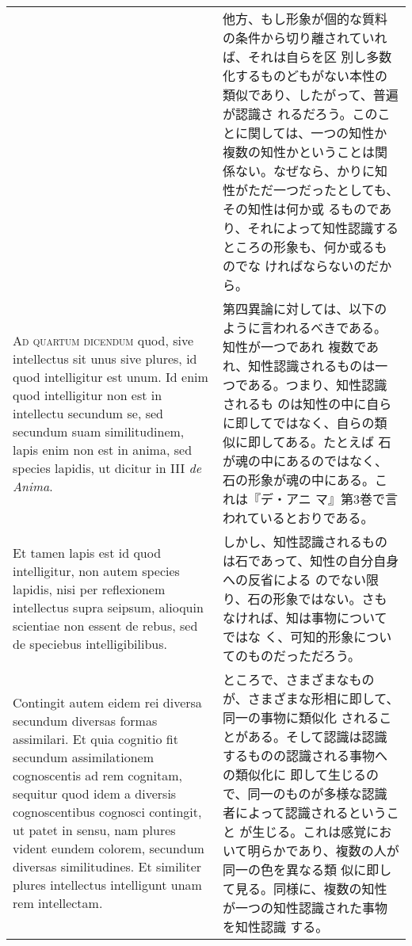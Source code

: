 \documentclass[paper=a4paper,fontsize=10pt,jafontsize=9pt,titlepage]{jlreq}
\begin{document}
\begin{longtable}{p{21em}p{21em}}
&

他方、もし形象が個的な質料の条件から切り離されていれば、それは自らを区
別し多数化するものどもがない本性の類似であり、したがって、普遍が認識さ
れるだろう。このことに関しては、一つの知性か複数の知性かということは関
係ない。なぜなら、かりに知性がただ一つだったとしても、その知性は何か或
るものであり、それによって知性認識するところの形象も、何か或るものでな
ければならないのだから。
 
\\



 {\scshape Ad quartum dicendum} quod, sive intellectus sit unus sive
 plures, id quod intelligitur est unum. Id enim quod intelligitur non
 est in intellectu secundum se, sed secundum suam similitudinem, lapis
 enim non est in anima, sed species lapidis, ut dicitur in III
 {\itshape de Anima}.

&

 第四異論に対しては、以下のように言われるべきである。知性が一つであれ
 複数であれ、知性認識されるものは一つである。つまり、知性認識されるも
 のは知性の中に自らに即してではなく、自らの類似に即してある。たとえば
 石が魂の中にあるのではなく、石の形象が魂の中にある。これは『デ・アニ
 マ』第3巻で言われているとおりである。
  
\\


 Et tamen lapis est id quod intelligitur, non autem species lapidis,
 nisi per reflexionem intellectus supra seipsum, alioquin scientiae
 non essent de rebus, sed de speciebus intelligibilibus.

 &

 しかし、知性認識されるものは石であって、知性の自分自身への反省による
 のでない限り、石の形象ではない。さもなければ、知は事物についてではな
 く、可知的形象についてのものだっただろう。

 \\

 Contingit autem eidem rei diversa secundum diversas formas
 assimilari.  Et quia cognitio fit secundum assimilationem
 cognoscentis ad rem cognitam, sequitur quod idem a diversis
 cognoscentibus cognosci contingit, ut patet in sensu, nam plures
 vident eundem colorem, secundum diversas similitudines. Et similiter
 plures intellectus intelligunt unam rem intellectam.

&

ところで、さまざまなものが、さまざまな形相に即して、同一の事物に類似化
されることがある。そして認識は認識するものの認識される事物への類似化に
即して生じるので、同一のものが多様な認識者によって認識されるということ
が生じる。これは感覚において明らかであり、複数の人が同一の色を異なる類
似に即して見る。同様に、複数の知性が一つの知性認識された事物を知性認識
する。
 

\end{longtable}
\end{document}
